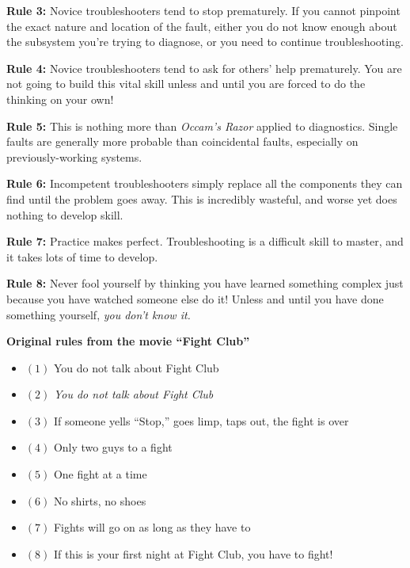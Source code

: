 \vskip 10pt

{\bf Rule 3:} Novice troubleshooters tend to stop prematurely.  If you cannot pinpoint the exact nature and location of the fault, either you do not know enough about the subsystem you're trying to diagnose, or you need to continue troubleshooting.

\vskip 10pt

{\bf Rule 4:} Novice troubleshooters tend to ask for others' help prematurely.  You are not going to build this vital skill unless and until you are forced to do the thinking on your own!

\vskip 10pt

{\bf Rule 5:} This is nothing more than {\it Occam's Razor} applied to diagnostics.  Single faults are generally more probable than coincidental faults, especially on previously-working systems.

\vskip 10pt

{\bf Rule 6:} Incompetent troubleshooters simply replace all the components they can find until the problem goes away.  This is incredibly wasteful, and worse yet does nothing to develop skill.

\vskip 10pt

{\bf Rule 7:} Practice makes perfect.  Troubleshooting is a difficult skill to master, and it takes lots of time to develop.

\vskip 10pt

{\bf Rule 8:} Never fool yourself by thinking you have learned something complex just because you have watched someone else do it!  Unless and until you have done something yourself, {\it you don't know it.}

\vskip 10pt

 






\noindent
{\bf Original rules from the movie ``Fight Club''}

\begin{itemize}
\item{$(1)$} You do not talk about Fight Club
\vskip 10pt
\item{$(2)$} {\it You do not talk about Fight Club}
\vskip 10pt
\item{$(3)$} If someone yells ``Stop,'' goes limp, taps out, the fight is over
\vskip 10pt
\item{$(4)$} Only two guys to a fight
\vskip 10pt
\item{$(5)$} One fight at a time
\vskip 10pt
\item{$(6)$} No shirts, no shoes
\vskip 10pt
\item{$(7)$} Fights will go on as long as they have to
\vskip 10pt
\item{$(8)$} If this is your first night at Fight Club, you have to fight!
\end{itemize}





